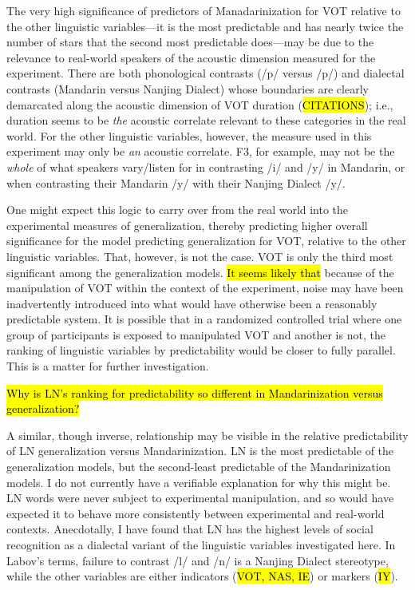 The very high significance of predictors of Manadarinization for VOT relative to the other linguistic variables---it is the most predictable and has nearly twice the number of stars that the second most predictable does---may be due to the relevance to real-world speakers of the acoustic dimension measured for the experiment. There are both phonological contrasts (/p/ versus /p/) and dialectal contrasts (Mandarin versus Nanjing Dialect) whose boundaries are clearly demarcated along the acoustic dimension of VOT duration (\hl{CITATIONS}); i.e., duration seems to be \emph{the} acoustic correlate relevant to these categories in the real world. For the other linguistic variables, however, the measure used in this experiment may only be \emph{an} acoustic correlate. F3, for example, may not be the \emph{whole} of what speakers vary\slash listen for in contrasting /i/ and /y/ in Mandarin, or when contrasting their Mandarin /y/ with their Nanjing Dialect /y/.

One might expect this logic to carry over from the real world into the experimental measures of generalization, thereby predicting higher overall significance for the model predicting generalization for VOT, relative to the other linguistic variables. That, however, is not the case. VOT is only the third most significant among the generalization models. \hl{It seems likely that} because of the manipulation of VOT within the context of the experiment, noise may have been inadvertently introduced into what would have otherwise been a reasonably predictable system. It is possible that in a randomized controlled trial where one group of participants is exposed to manipulated VOT and another is not, the ranking of linguistic variables by predictability would be closer to fully parallel. This is a matter for further investigation.

\hl{Why is LN's ranking for predictability so different in Mandarinization versus generalization?}

A similar, though inverse, relationship may be visible in the relative predictability of LN generalization versus Mandarinization. LN is the most predictable of the generalization models, but the second-least predictable of the Mandarinization models. I do not currently have a verifiable explanation for why this might be. LN words were never subject to experimental manipulation, and so would have expected it to behave more consistently between experimental and real-world contexts. Anecdotally, I have found that LN has the highest levels of social recognition as a dialectal variant of the linguistic variables investigated here. In Labov's \citeyearpar{labov1971study} terms, failure to contrast /l/ and /n/ is a Nanjing Dialect stereotype, while the other variables are either indicators (\hl{VOT, NAS, IE}) or markers (\hl{IY}).


